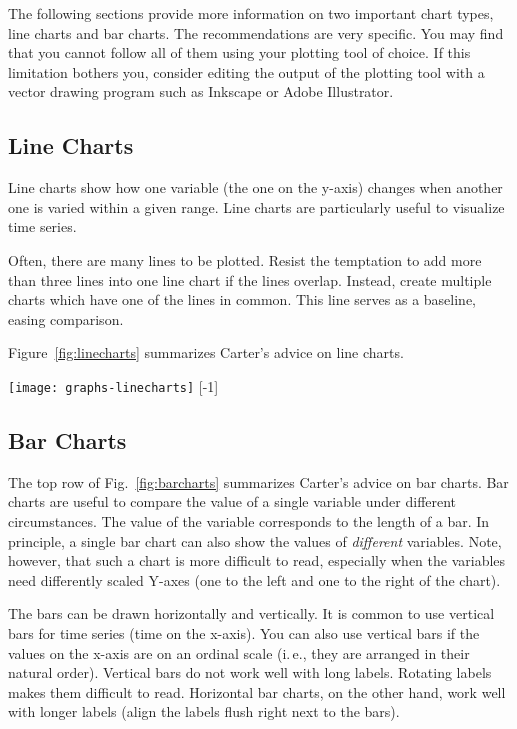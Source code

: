 The following sections provide more information on two important chart types, line charts and bar charts. The recommendations are very specific. You may find that you cannot follow all of them using your plotting tool of choice. If this limitation bothers you, consider editing the output of the plotting tool with a vector drawing program such as Inkscape or Adobe Illustrator.

\subsection{Line Charts}

Line charts show how one variable (the one on the y-axis) changes when another one is varied within a given range. Line charts are particularly useful to visualize time series.

Often, there are many lines to be plotted. Resist the temptation to add more than three lines into one line chart if the lines overlap. Instead, create multiple charts which have one of the lines in common. This line serves as a baseline, easing comparison.

Figure~\ref{fig:linecharts} summarizes Carter's advice on line charts.

\begin{figure*}[t]
\centering
\texttt{[image: graphs-linecharts]}
[-1\baselineskip]
\end{figure*}

\subsection{Bar Charts}

The top row of Fig.~\ref{fig:barcharts} summarizes Carter's advice on bar charts.
Bar charts are useful to compare the value of a single variable under different circumstances. The value of the variable corresponds to the length of a bar. In principle, a single bar chart can also show the values of \emph{different} variables. Note, however, that such a chart is more difficult to read, especially when the variables need differently scaled Y-axes (one to the left and one to the right of the chart).

The bars can be drawn horizontally and vertically. It is common to use vertical bars for time series (time on the x-axis). You can also use vertical bars if the values on the x-axis are on an ordinal scale (i.\,e., they are arranged in their natural order). Vertical bars do not work well with long labels. Rotating labels makes them difficult to read. Horizontal bar charts, on the other hand, work well with longer labels (align the labels flush right next to the bars).

